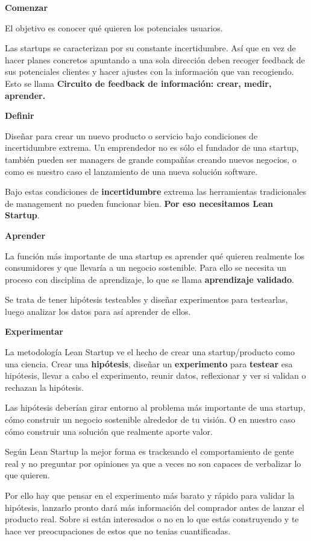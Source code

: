 \documentclass[12pt,twoside,titlepage]{report}
\begin{document}
\textbf{Comenzar}

El objetivo es conocer qué quieren los potenciales usuarios. 

Las startups se caracterizan por su constante incertidumbre. Así que en vez de hacer planes concretos apuntando a una sola dirección deben recoger feedback de sus potenciales clientes y hacer ajustes con la información que van recogiendo. Esto se llama \textbf{Circuito de feedback de información: crear, medir, aprender.}

\textbf{Definir}

Diseñar para crear un nuevo producto o servicio bajo condiciones de incertidumbre extrema. Un emprendedor no es sólo el fundador de una startup, también pueden ser managers de grande compañías creando nuevos negocios, o como es nuestro caso el lanzamiento de una nueva solución software.

Bajo estas condiciones de \textbf{incertidumbre} extrema las herramientas tradicionales de management no pueden funcionar bien. \textbf{Por eso necesitamos Lean Startup}.

\textbf{Aprender}

La función más importante de una startup es aprender qué quieren realmente los consumidores y que llevaría a un negocio sostenible. Para ello se necesita un proceso con disciplina de aprendizaje, lo que se llama \textbf{aprendizaje validado}. 

Se trata de tener hipótesis testeables y diseñar experimentos para testearlas, luego analizar los datos para así aprender de ellos.

\textbf{Experimentar}

La metodología Lean Startup ve el hecho de crear una startup/producto como una ciencia. Crear una \textbf{hipótesis}, diseñar un \textbf{experimento} para \textbf{testear} esa hipótesis, llevar a cabo el experimento, reunir datos, reflexionar y ver si validan o rechazan la hipótesis.

Las hipótesis deberían girar entorno al problema más importante de una startup, cómo construir un negocio sostenible alrededor de tu visión. O en nuestro caso cómo construir una solución que realmente aporte valor.

Según Lean Startup la mejor forma es trackeando el comportamiento de gente real y no preguntar por opiniones ya que a veces no son capaces de verbalizar lo que quieren.

Por ello hay que pensar en el experimento más barato y rápido para validar la hipótesis, lanzarlo pronto dará más información del comprador antes de lanzar el producto real. Sobre si están interesados o no en lo que estás construyendo y te hace ver preocupaciones de estos que no tenias cuantificadas.
\end{document}
